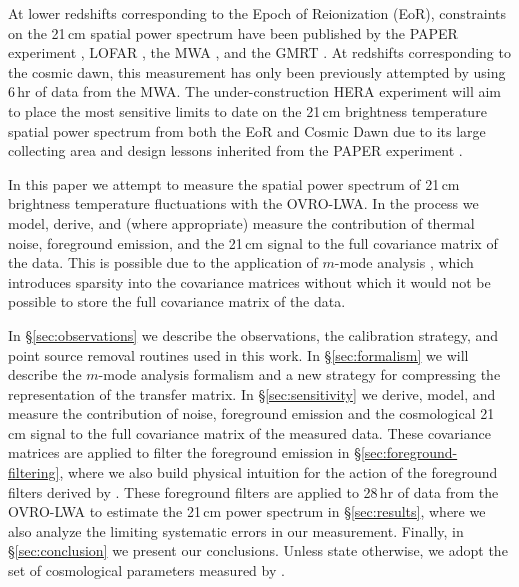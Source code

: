 \documentclass[twocolumn]{aastex62}
\begin{document}
At lower redshifts corresponding to the Epoch of Reionization (EoR), constraints on the 21\,cm
spatial power spectrum have been published by the PAPER experiment \citep{2015ApJ...809...61A},
LOFAR \citep{2017ApJ...838...65P}, the MWA \citep{2016ApJ...833..102B}, and the GMRT
\citep{2013MNRAS.433..639P}. At redshifts corresponding to the cosmic dawn, this measurement has
only been previously attempted by \citet{2016MNRAS.460.4320E} using 6\,hr of data from the MWA.  The
under-construction HERA experiment will aim to place the most sensitive limits to date on the 21\,cm
brightness temperature spatial power spectrum from both the EoR and Cosmic Dawn due to its large
collecting area and design lessons inherited from the PAPER experiment \citep{2017PASP..129d5001D}.

In this paper we attempt to measure the spatial power spectrum of 21\,cm brightness temperature
fluctuations with the OVRO-LWA. In the process we model, derive, and (where appropriate) measure the
contribution of thermal noise, foreground emission, and the 21\,cm signal to the full covariance
matrix of the data. This is possible due to the application of $m$-mode analysis
\citep{2014ApJ...781...57S, 2015PhRvD..91h3514S}, which introduces sparsity into the covariance
matrices without which it would not be possible to store the full covariance matrix of the data.

In \S\ref{sec:observations} we describe the observations, the calibration strategy, and point source
removal routines used in this work. In \S\ref{sec:formalism} we will describe the $m$-mode analysis
formalism and a new strategy for compressing the representation of the transfer matrix.  In
\S\ref{sec:sensitivity} we derive, model, and measure the contribution of noise, foreground emission
and the cosmological 21\,cm signal to the full covariance matrix of the measured data.  These
covariance matrices are applied to filter the foreground emission in
\S\ref{sec:foreground-filtering}, where we also build physical intuition for the action of the
foreground filters derived by \citep{2014ApJ...781...57S, 2015PhRvD..91h3514S}.  These foreground
filters are applied to 28\,hr of data from the OVRO-LWA to estimate the 21\,cm power spectrum in
\S\ref{sec:results}, where we also analyze the limiting systematic errors in our measurement.
Finally, in \S\ref{sec:conclusion} we present our conclusions.  Unless state otherwise, we adopt the
set of cosmological parameters measured by \citet{2016A&A...594A..13P}.

\end{document}
